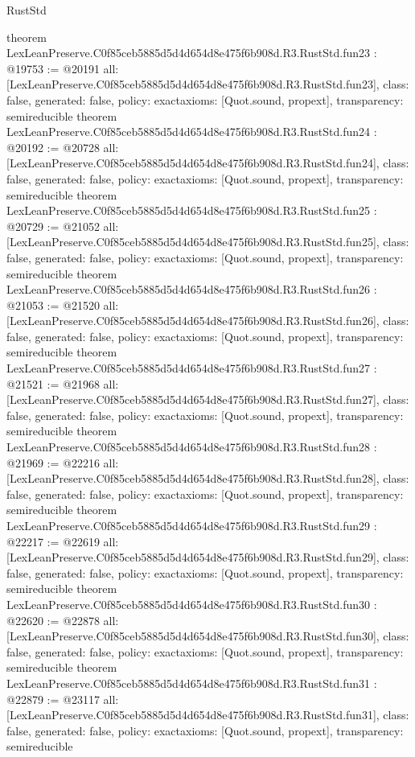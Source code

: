 \begin{lexlean}{RustStd}
\begin{coremodule}
{}
theorem LexLeanPreserve.C0f85ceb5885d5d4d654d8e475f6b908d.R3.RustStd.fun23 : @19753 := @20191 {
  all: [LexLeanPreserve.C0f85ceb5885d5d4d654d8e475f6b908d.R3.RustStd.fun23],
  class: false,
  generated: false,
  policy: exact{axioms: [Quot.sound, propext]},
  transparency: semireducible
}
theorem LexLeanPreserve.C0f85ceb5885d5d4d654d8e475f6b908d.R3.RustStd.fun24 : @20192 := @20728 {
  all: [LexLeanPreserve.C0f85ceb5885d5d4d654d8e475f6b908d.R3.RustStd.fun24],
  class: false,
  generated: false,
  policy: exact{axioms: [Quot.sound, propext]},
  transparency: semireducible
}
theorem LexLeanPreserve.C0f85ceb5885d5d4d654d8e475f6b908d.R3.RustStd.fun25 : @20729 := @21052 {
  all: [LexLeanPreserve.C0f85ceb5885d5d4d654d8e475f6b908d.R3.RustStd.fun25],
  class: false,
  generated: false,
  policy: exact{axioms: [Quot.sound, propext]},
  transparency: semireducible
}
theorem LexLeanPreserve.C0f85ceb5885d5d4d654d8e475f6b908d.R3.RustStd.fun26 : @21053 := @21520 {
  all: [LexLeanPreserve.C0f85ceb5885d5d4d654d8e475f6b908d.R3.RustStd.fun26],
  class: false,
  generated: false,
  policy: exact{axioms: [Quot.sound, propext]},
  transparency: semireducible
}
theorem LexLeanPreserve.C0f85ceb5885d5d4d654d8e475f6b908d.R3.RustStd.fun27 : @21521 := @21968 {
  all: [LexLeanPreserve.C0f85ceb5885d5d4d654d8e475f6b908d.R3.RustStd.fun27],
  class: false,
  generated: false,
  policy: exact{axioms: [Quot.sound, propext]},
  transparency: semireducible
}
theorem LexLeanPreserve.C0f85ceb5885d5d4d654d8e475f6b908d.R3.RustStd.fun28 : @21969 := @22216 {
  all: [LexLeanPreserve.C0f85ceb5885d5d4d654d8e475f6b908d.R3.RustStd.fun28],
  class: false,
  generated: false,
  policy: exact{axioms: [Quot.sound, propext]},
  transparency: semireducible
}
theorem LexLeanPreserve.C0f85ceb5885d5d4d654d8e475f6b908d.R3.RustStd.fun29 : @22217 := @22619 {
  all: [LexLeanPreserve.C0f85ceb5885d5d4d654d8e475f6b908d.R3.RustStd.fun29],
  class: false,
  generated: false,
  policy: exact{axioms: [Quot.sound, propext]},
  transparency: semireducible
}
theorem LexLeanPreserve.C0f85ceb5885d5d4d654d8e475f6b908d.R3.RustStd.fun30 : @22620 := @22878 {
  all: [LexLeanPreserve.C0f85ceb5885d5d4d654d8e475f6b908d.R3.RustStd.fun30],
  class: false,
  generated: false,
  policy: exact{axioms: [Quot.sound, propext]},
  transparency: semireducible
}
theorem LexLeanPreserve.C0f85ceb5885d5d4d654d8e475f6b908d.R3.RustStd.fun31 : @22879 := @23117 {
  all: [LexLeanPreserve.C0f85ceb5885d5d4d654d8e475f6b908d.R3.RustStd.fun31],
  class: false,
  generated: false,
  policy: exact{axioms: [Quot.sound, propext]},
  transparency: semireducible
}
\end{coremodule}
\end{lexlean}
